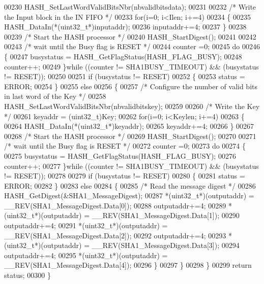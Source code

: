 \begin{DoxyCode}
00230     HASH_SetLastWordValidBitsNbr(nbvalidbitsdata);
00231 
00232     \textcolor{comment}{/* Write the Input block in the IN FIFO */}
00233     \textcolor{keywordflow}{for}(i=0; i<Ilen; i+=4)
00234     \{
00235       HASH_DataIn(*(uint32\_t*)inputaddr);
00236       inputaddr+=4;
00237     \}
00238 
00239     \textcolor{comment}{/* Start the HASH processor */}
00240     HASH_StartDigest();
00241 
00242 
00243     \textcolor{comment}{/* wait until the Busy flag is RESET */}
00244     counter =0;
00245     \textcolor{keywordflow}{do}
00246     \{
00247       busystatus = HASH_GetFlagStatus(HASH_FLAG_BUSY);
00248       counter++;
00249     \}\textcolor{keywordflow}{while} ((counter != SHA1BUSY_TIMEOUT) && (busystatus != RESET));
00250 
00251     \textcolor{keywordflow}{if} (busystatus != RESET)
00252     \{
00253       status = ERROR;
00254     \}
00255     \textcolor{keywordflow}{else}
00256     \{  
00257       \textcolor{comment}{/* Configure the number of valid bits in last word of the Key */}
00258       HASH_SetLastWordValidBitsNbr(nbvalidbitskey);
00259 
00260       \textcolor{comment}{/* Write the Key */}
00261       keyaddr = (uint32\_t)Key;
00262       \textcolor{keywordflow}{for}(i=0; i<Keylen; i+=4)
00263       \{
00264         HASH_DataIn(*(uint32\_t*)keyaddr);
00265         keyaddr+=4;
00266       \}
00267 
00268       \textcolor{comment}{/* Start the HASH processor */}
00269       HASH_StartDigest();
00270 
00271       \textcolor{comment}{/* wait until the Busy flag is RESET */}
00272       counter =0;
00273       \textcolor{keywordflow}{do}
00274       \{
00275         busystatus = HASH_GetFlagStatus(HASH_FLAG_BUSY);
00276         counter++;
00277       \}\textcolor{keywordflow}{while} ((counter != SHA1BUSY_TIMEOUT) && (busystatus != RESET));
00278 
00279       \textcolor{keywordflow}{if} (busystatus != RESET)
00280       \{
00281         status = ERROR;
00282       \}
00283       \textcolor{keywordflow}{else}
00284       \{
00285         \textcolor{comment}{/* Read the message digest */}
00286         HASH_GetDigest(&SHA1\_MessageDigest);
00287         *(uint32\_t*)(outputaddr)  = \_\_REV(SHA1\_MessageDigest.Data[0]);
00288         outputaddr+=4;
00289         *(uint32\_t*)(outputaddr)  = \_\_REV(SHA1\_MessageDigest.Data[1]);
00290         outputaddr+=4;
00291         *(uint32\_t*)(outputaddr)  = \_\_REV(SHA1\_MessageDigest.Data[2]);
00292         outputaddr+=4;
00293         *(uint32\_t*)(outputaddr)  = \_\_REV(SHA1\_MessageDigest.Data[3]);
00294         outputaddr+=4;
00295         *(uint32\_t*)(outputaddr)  = \_\_REV(SHA1\_MessageDigest.Data[4]);
00296       \}
00297     \}  
00298   \}
00299   \textcolor{keywordflow}{return} status;  
00300 \}
\end{DoxyCode}
